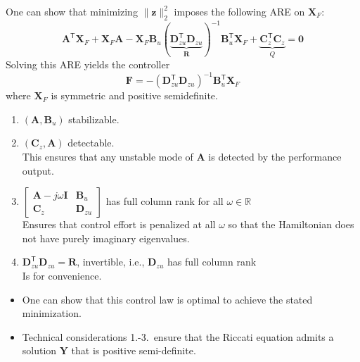 \newpar{}

One can show that minimizing $\|\mathbf{z}\|_2^2$ imposes the following ARE on $\mathbf{X}_F$:
\begin{equation*}
    \mathbf{A}^{\mathsf{T}}\mathbf{X}_F + \mathbf{X}_F \mathbf{A} - \mathbf{X}_F \mathbf{B}_u{(\underbrace{\mathbf{D}_{zu}^{\mathsf{T}}\mathbf{D}_{zu}}_{\mathbf{R}})}^{-1} \mathbf{B}_u^{\mathsf{T}} \mathbf{X}_F + \underbrace{\mathbf{C}_z^{\mathsf{T}}\mathbf{C}_z}_{Q} = \mathbf{0}
\end{equation*}
Solving this ARE yields the controller
\begin{equation*}
    \mathbf{F} = -{\left(\mathbf{D}_{zu}^{\mathsf{T}}\mathbf{D}_{zu}\right)}^{-1} \mathbf{B}_u^{\mathsf{T}}\mathbf{X}_F
\end{equation*}
where $\mathbf{X}_F$ is symmetric and positive semidefinite.

\newpar{}

\begin{enumerate}
    \item $(\mathbf{A},\mathbf{B}_u)$ stabilizable.
    \item $(\mathbf{C}_z,\mathbf{A})$ detectable.\\
          This ensures that any unstable mode of $\mathbf{A}$ is detected by the performance output.
    \item $\begin{bmatrix} \mathbf{A}- j\omega \mathbf{I}& \mathbf{B}_u\\ \mathbf{C}_z& \mathbf{D}_{zu}\end{bmatrix}$ has full column rank for all $\omega\in\mathbb{R}$\\
          Ensures that control effort is penalized at all $\omega$ so that the Hamiltonian does not have purely imaginary eigenvalues.
    \item $\mathbf{D}_{zu}^{\mathsf{T}}\mathbf{D}_{zu}=\mathbf{R}$, invertible, i.e., $\mathbf{D}_{zu}$ has full column rank\\
          Is for convenience.
\end{enumerate}

\newpar{}

\begin{itemize}
    \item One can show that this control law is optimal to achieve the stated minimization.
    \item Technical considerations 1.-3.\ ensure that the Riccati equation admits a solution $\mathbf{Y}$ that is positive semi-definite.
\end{itemize}

